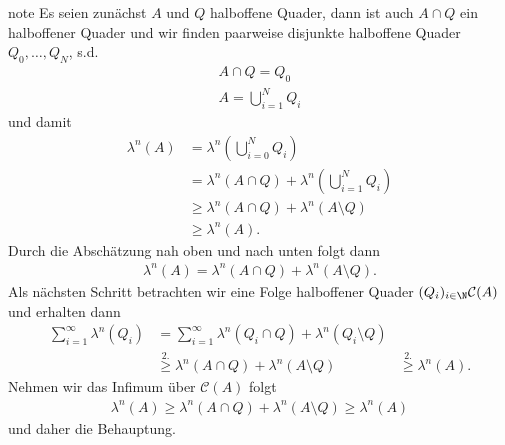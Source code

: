 \documentclass[letterpaper,10pt,english]{jupyterBook}
\begin{document}
\begin{sphinxadmonition}{note}
\sphinxAtStartPar
Es seien zunächst \(A\) und \(Q\) halboffene Quader, dann ist auch \(A\cap Q\) ein halboffener Quader und wir finden paarweise disjunkte halboffene Quader \(Q_0,\ldots,Q_N\), s.d.
\begin{equation*}
\begin{split}A\cap Q = Q_0\\
A = \bigcup_{i=1}^N Q_i\end{split}
\end{equation*}
\sphinxAtStartPar
und damit
\begin{equation*}
\begin{split}\lambda^n(A) &= \lambda^n\left(\bigcup_{i=0}^N Q_i\right)\\
&= 
\lambda^n(A\cap Q) + \lambda^n\left(\bigcup_{i=1}^N Q_i\right)\\
&\geq \lambda^n(A\cap Q) + \lambda^n(A\setminus Q) \\
&\geq \lambda^n(A).\end{split}
\end{equation*}
\sphinxAtStartPar
Durch die Abschätzung nah oben und nach unten folgt dann
\begin{equation*}
\begin{split}\lambda^n(A) = \lambda^n(A\cap Q) + \lambda^n(A\setminus Q).\end{split}
\end{equation*}
\sphinxAtStartPar
Als nächsten Schritt betrachten wir eine Folge halboffener Quader \((Q_i)_{i\in\N}\mathcal{C}(A)\) und erhalten dann
\begin{equation*}
\begin{split}\sum_{i=1}^\infty \lambda^n(Q_i) &= 
\sum_{i=1}^\infty \lambda^n(Q_i\cap Q) + \lambda^n(Q_i\setminus Q)\\
&\overset{2.}{\geq}
\lambda^n(A\cap Q) + \lambda^n(A\setminus Q)
&\overset{2.}{\geq}
\lambda^n(A).\end{split}
\end{equation*}
\sphinxAtStartPar
Nehmen wir das Infimum über \(\mathcal{C}(A)\) folgt
\begin{equation*}
\begin{split}\lambda^n(A) \geq \lambda^n(A\cap Q) + \lambda^n(A\setminus Q) \geq 
\lambda^n(A)\end{split}
\end{equation*}
\sphinxAtStartPar
und daher die Behauptung.
\end{sphinxadmonition}
\end{document}
